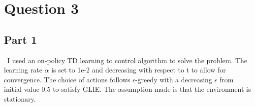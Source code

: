 \documentclass{article}
\begin{document}
    \section{Question 3}

    \subsection{Part 1}\
    I used an on-policy TD learning to control algorithm to solve the problem.
    The learning rate $\alpha$ is set to 1e-2 and decreasing with respect to t to allow for convergence.
    The choice of actions follows $\epsilon$-greedy with a decreasing $\epsilon$ from initial value 0.5 to satisfy GLIE.
    The assumption made is that the environment is stationary.
\end{document}
